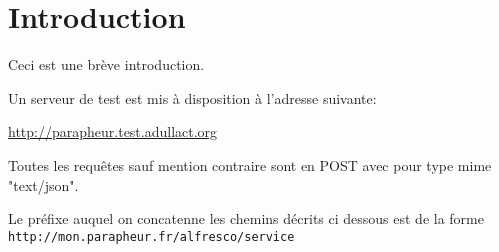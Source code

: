 \section*{Introduction}
Ceci est une brève introduction.

Un serveur de test est mis à disposition à l'adresse suivante:

\href{http://parapheur.test.adullact.org}{http://parapheur.test.adullact.org}

Toutes les requêtes sauf mention contraire sont en POST avec pour type mime "text/json". 

Le préfixe auquel on concatenne les chemins décrits ci dessous est de la forme \verb|http://mon.parapheur.fr/alfresco/service|

